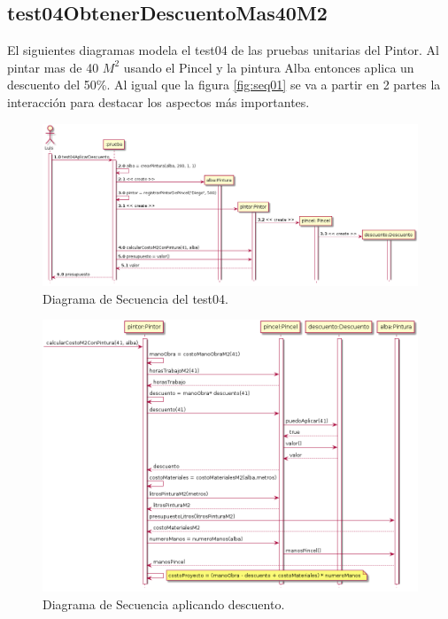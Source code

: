 \documentclass[titlepage,a4paper]{article}
\begin{document}
\subsection{test04ObtenerDescuentoMas40M2}

El siguientes diagramas modela el test04 de las pruebas unitarias del Pintor. Al pintar mas de
40 $M^2$ usando el Pincel y la pintura Alba entonces aplica un descuento del 50\%. Al igual que la figura \ref{fig:seq01} se 
va a partir en 2 partes la interacción para destacar los aspectos más importantes.
\begin{figure}[H]
  \centering
  \includegraphics[width=1.0\textwidth]{diagrama_secuencia03.png}
  \caption{\label{fig:seq03}Diagrama de Secuencia del test04.}
  \end{figure}

  \begin{figure}[H]
    \centering
    \includegraphics[width=1.0\textwidth]{diagrama_secuencia04.png}
    \caption{\label{fig:seq04}Diagrama de Secuencia aplicando descuento.}
    \end{figure}
\end{document}
